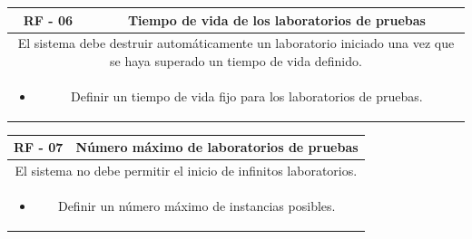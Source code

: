                 \begin{table}[!htbp]
                    \centering

                    \begin{tabular}{|c|c|}
                        \hline
                        \textbf{RF - 06} & \textbf{Tiempo de vida de los laboratorios de pruebas} \\
                        \hline
                        \multicolumn{2}{|p{15cm}|}{
                            El sistema debe destruir automáticamente un laboratorio iniciado una vez que se haya superado un tiempo de vida definido.
                        } \\
                        \hline
                        \multicolumn{2}{|p{15cm}|}{
                            \begin{itemize}
                                \item Definir un tiempo de vida fijo para los laboratorios de pruebas.
                            \end{itemize}
                            } \\
                        \hline
                    \end{tabular}

                    \label{tab:RF6}
                \end{table}
                
                \begin{table}[!htbp]
                    \centering

                    \begin{tabular}{|c|c|}
                        \hline
                        \textbf{RF - 07} & \textbf{Número máximo de laboratorios de pruebas} \\
                        \hline
                        \multicolumn{2}{|p{15cm}|}{
                            El sistema no debe permitir el inicio de infinitos laboratorios.
                        } \\
                        \hline
                        \multicolumn{2}{|p{15cm}|}{
                            \begin{itemize}
                                \item Definir un número máximo de instancias posibles.
                            \end{itemize}
                            } \\
                        \hline
                    \end{tabular}

                    \label{tab:RF7}
                \end{table}
                
